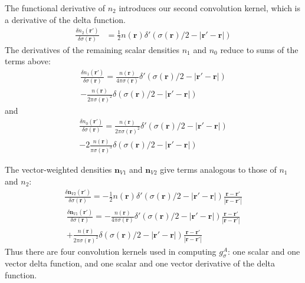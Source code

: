 \documentclass[letterpaper,twocolumn,amsmath,amssymb,pre]{revtex4-1}
\newcommand{\rr}{\textbf{r}}
\begin{document}
The functional derivative of $n_2$ introduces our second convolution
kernel, which is a derivative of the delta function.
\begin{align}
  \frac{\delta n_2(\rr')}{\delta \sigma(\rr)} &= \frac 12 n(\rr) \delta'(\sigma(\rr)/2 -\left|\rr' - \rr\right|)
\end{align}
The derivatives of the remaining scalar densities $n_1$ and $n_0$ reduce to
sums of the terms above:
\begin{multline}
  \frac{\delta n_1(\rr')}{\delta \sigma(\rr)}
  = \frac{n(\rr)}{4\pi
    \sigma(\rr)}\delta'(\sigma(\rr)/2 -\left|\rr' - \rr\right|) \\
  -
  \frac{n(\rr)}{2\pi
    \sigma(\rr)^2}\delta(\sigma(\rr)/2 -\left|\rr' - \rr\right|)
\end{multline}
and
\begin{multline}
  \frac{\delta n_0(\rr')}{\delta \sigma(\rr)}
  = \frac{n(\rr)}{2\pi
    \sigma(\rr)^2}\delta'(\sigma(\rr)/2 -\left|\rr' - \rr\right|)
  \\-
  2 \frac{n(\rr)}{\pi
    \sigma(\rr)^3}\delta(\sigma(\rr)/2 -\left|\rr' - \rr\right|)
\end{multline}

The vector-weighted densities $\mathbf{n}_{V1}$ and $\mathbf{n}_{V2}$
give terms analogous to those of $n_1$ and $n_2$:
\begin{multline}
  \frac{\delta \mathbf{n}_{V2}(\rr')}{\delta \sigma(\rr)} = -\frac 12 n(\rr) \delta'(\sigma(\rr)/2 -\left|\rr' - \rr\right|)
    \frac{\rr-\rr'}{|\rr-\rr'|}
\end{multline}
\begin{multline}
  \frac{\delta \mathbf{n}_{V1}(\rr')}{\delta \sigma(\rr)}
  = -\frac{n(\rr)}{4\pi
    \sigma(\rr)}\delta'(\sigma(\rr)/2 -\left|\rr' - \rr\right|) \frac{\rr-\rr'}{|\rr-\rr'|}
  \\ +
  \frac{n(\rr)}{2\pi
    \sigma(\rr)^2}\delta(\sigma(\rr)/2 -\left|\rr' - \rr\right|) \frac{\rr-\rr'}{|\rr-\rr'|}
\end{multline}
Thus there are four convolution kernels used in computing $g_\sigma^A$:
one scalar and one vector delta function, and one scalar and one
vector derivative of the delta function.

\end{document}
